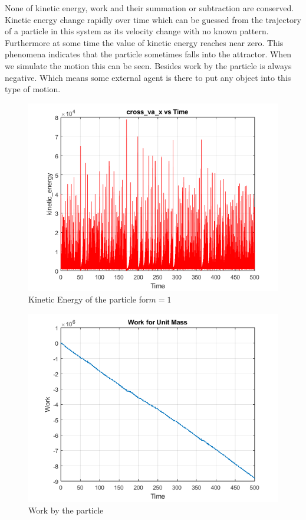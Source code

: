 \documentclass[%
reprint,
amsmath,amssymb,
aps,
floatfix,
]{revtex4-2}
\begin{document}
	None of kinetic energy, work and their summation or subtraction are conserved. Kinetic energy change rapidly over time which can be guessed from the trajectory of a particle in this system as its velocity change with no known pattern. Furthermore at some time the value of kinetic energy reaches near zero. This phenomena indicates that the particle sometimes falls into the attractor. When we simulate the motion this can be seen. Besides work by the particle is always negative. Which means some external agent is there to put any object into this type of motion. 
	\FloatBarrier
	\begin{figure}[htbp]
		\centering
		\includegraphics[width=0.8\linewidth]{kinetic_energy_plot.png}
		\caption{Kinetic Energy of the particle for$m=1$}
		\label{fig:kinetic_energy}
	\end{figure}
	\begin{figure}[htbp]
		\centering
		\includegraphics[width=0.8\linewidth]{work.png}
		\caption{Work by the particle}
		\label{fig:work}
	\end{figure}
	
\end{document}
